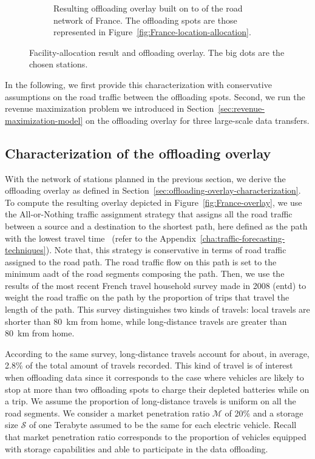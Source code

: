 \begin{figure}[ht]
\begin{subfigure}[t]{0.5\columnwidth}
            \caption{Resulting offloading overlay built on to of the road network of France. The offloading spots are those represented in Figure~\ref{fig:France-location-allocation}.}
            \label{fig:France-overlay-wo-capacity}
    \end{subfigure}
    \caption{Facility-allocation result and offloading overlay. The big dots are the chosen stations.}
\end{figure}

In the following, we first provide this characterization with conservative assumptions on the road traffic between the offloading spots. Second, we run the revenue maximization problem we introduced in Section~\ref{sec:revenue-maximization-model} on the offloading overlay for three large-scale data transfers. 


\subsection{Characterization of the offloading overlay}
\label{sec:eval-offloading-overlay}

With the network of stations planned in the previous section, we derive the offloading overlay as defined in Section~\ref{sec:offloading-overlay-characterization}. To compute the resulting overlay depicted in Figure~\ref{fig:France-overlay}, we use the All-or-Nothing traffic assignment strategy that assigns all the road traffic between a source and a destination to the shortest path, here defined as the path with the lowest travel time~\cite{de2011modelling,sheffi1985urban} (refer to the Appendix~\ref{cha:traffic-forecasting-techniques}). Note that, this strategy is conservative in terms of road traffic assigned to the road path. The road traffic flow on this path is set to the minimum \acrshort{aadt} of the road segments composing the path. Then, we use the results of the most recent French travel household survey made in 2008 (\acrfull{entd}) to weight the road traffic on the path by the proportion of trips that travel the length of the path. This survey distinguishes two kinds of travels: local travels are shorter than 80~km from home, while long-distance travels are greater than 80~km from home.

According to the same survey, long-distance travels account for about, in average, 2.8\% of the total amount of travels recorded. This kind of travel is of interest when offloading data since it corresponds to the case where vehicles are likely to stop at more than two offloading spots to charge their depleted batteries while on a trip. We assume the proportion of long-distance travels is uniform  on all the road segments. We consider a market penetration ratio $\mathcal{M}$ of 20\% and a storage size $\mathcal{S}$ of one Terabyte assumed to be the same for each electric vehicle. Recall that market penetration ratio corresponds to the proportion of vehicles equipped with storage capabilities and able to participate in the data offloading.

